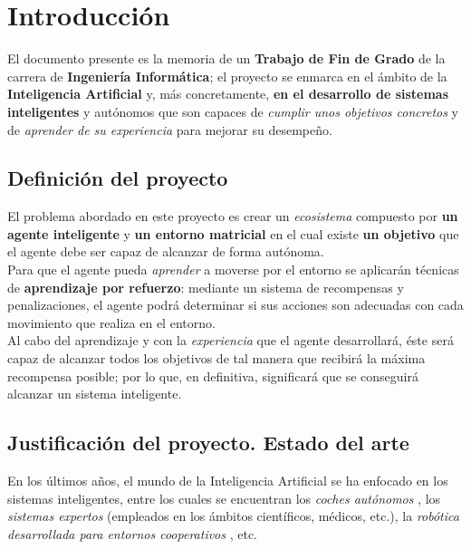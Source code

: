 
\chapter{Introducción} \label{introduccion}

El documento presente es la memoria de un \textbf{Trabajo de Fin de Grado} de la carrera de \textbf{Ingeniería Informática}; el proyecto se enmarca en el ámbito de la \textbf{Inteligencia Artificial} y, más concretamente, \textbf{en el desarrollo de sistemas inteligentes} y autónomos que son capaces de \textit{cumplir unos objetivos concretos} y de \textit{aprender de su experiencia} para mejorar su desempeño. 

\section{Definición del proyecto}

El problema abordado en este proyecto es crear un \textit{ecosistema} compuesto por \textbf{un agente inteligente} y \textbf{un entorno matricial} en el cual existe \textbf{un objetivo} que el agente debe ser capaz de alcanzar de forma autónoma. \\


Para que el agente pueda \textit{aprender} a moverse por el entorno se aplicarán técnicas de \textbf{aprendizaje por refuerzo}: mediante un sistema de recompensas y penalizaciones, el agente podrá determinar si sus acciones son adecuadas con cada movimiento que realiza en el entorno. \\

Al cabo del aprendizaje y con la \textit{experiencia} que el agente desarrollará, éste será capaz de alcanzar todos los objetivos de tal manera que recibirá la máxima recompensa posible; por lo que, en definitiva, significará que se conseguirá alcanzar un sistema inteligente. 

\section{Justificación del proyecto. Estado del arte}

En los últimos años, el mundo de la Inteligencia Artificial se ha enfocado en los sistemas inteligentes, entre los cuales se encuentran los \textit{coches autónomos} \cite{bimbraw2015autonomous}, los \textit{sistemas expertos} \cite{shortliffe2012computer} (empleados en los ámbitos científicos, médicos, etc.), la \textit{robótica desarrollada para entornos cooperativos} \cite{bostonDynamics, bdyn2018doors}, etc. \\

